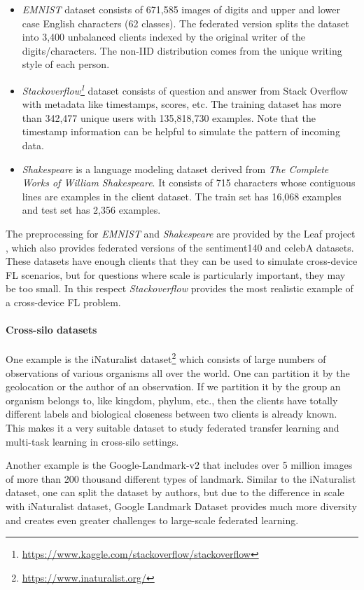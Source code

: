 \begin{itemize}
    \item \textit{EMNIST} dataset \cite{cohen2017emnist} consists of 671,585 images of digits and upper and lower case English characters (62 classes).
    The federated version splits the dataset into 3,400 unbalanced clients indexed by the original writer of the digits/characters.
    The non-IID distribution comes from the unique writing style of each person.
    \item \textit{Stackoverflow\footnote{\url{https://www.kaggle.com/stackoverflow/stackoverflow}}} dataset consists of question and answer from Stack Overflow with metadata like timestamps, scores, etc.
    The training dataset has more than 342,477 unique users with 135,818,730 examples.
    Note that the timestamp information can be helpful to simulate the pattern of incoming data.
    \item \textit{Shakespeare} is a language modeling dataset derived from \textit{The Complete Works of William Shakespeare}. 
    It consists of 715 characters whose contiguous lines are examples in the client dataset. The train set has 16,068 examples and test set has 2,356 examples.
\end{itemize}
The preprocessing for \textit{EMNIST} and \textit{Shakespeare} are provided by the Leaf project \cite{caldas2018leaf}, which also provides federated versions of the sentiment140 and celebA datasets. These datasets have enough clients that they can be used to simulate cross-device FL scenarios, but for questions where scale is particularly important, they may be too small. In this respect \textit{Stackoverflow} provides the most realistic example of a cross-device FL problem.

\paragraph{Cross-silo datasets}
One example is the iNaturalist dataset\footnote{\url{https://www.inaturalist.org/}} which consists of large numbers of observations of various organisms all over the world. One can partition it by the geolocation or the author of an observation. If we partition it by the group an organism belongs to, like kingdom, phylum, etc., then the clients have totally different labels and biological closeness between two clients is already known. This makes it a very suitable dataset to study federated transfer learning and multi-task learning in cross-silo settings. 

Another example is the Google-Landmark-v2 \citep{GDLv2} that includes over 5 million images of more than 200 thousand different types of landmark. Similar to the iNaturalist dataset, one can split the dataset by authors, but due to the difference in scale with iNaturalist dataset, Google Landmark Dataset provides much more diversity and creates even greater challenges to large-scale federated learning.

